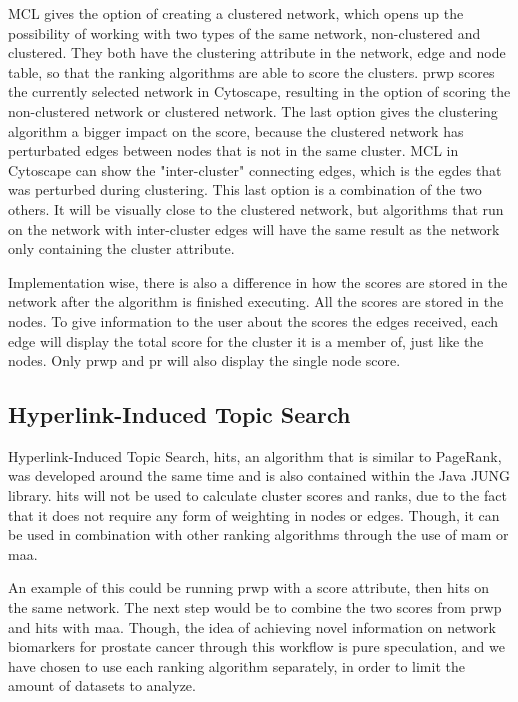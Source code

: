 MCL gives the option of creating a clustered network, which opens up the
possibility of working with two types of the same network, non-clustered and
clustered. They both have the clustering attribute in the network, edge and node
table, so that the ranking algorithms are able to score the clusters. \gls{prwp}
scores the currently selected network in Cytoscape, resulting in the option of
scoring the non-clustered network or clustered network. The last option gives
the clustering algorithm a bigger impact on the score, because the clustered
network has perturbated edges between nodes that is not in the same cluster. MCL
in Cytoscape can show the "inter-cluster" connecting edges, which is the egdes
that was perturbed during clustering. This last option is a combination of the
two others. It will be visually close to the clustered network, but algorithms
that run on the network with inter-cluster edges will have the same result as
the network only containing the cluster attribute.

Implementation wise, there is also a difference in how the scores are stored in
the network after the algorithm is finished executing. All the scores are stored
in the nodes. To give information to the user about the scores the edges
received, each edge will display the total score for the cluster it is a member
of, just like the nodes. Only \gls{prwp} and \gls{pr} will also display the
single node score.

\subsection{Hyperlink-Induced Topic Search}
Hyperlink-Induced Topic Search, \gls{hits}, an algorithm that is similar to
PageRank, was developed around the same time \cite{hits}\cite{hits-origin} and
is also contained within the Java JUNG library. \gls{hits} will not be used to
calculate cluster scores and ranks, due to the fact that it does not require any
form of weighting in nodes or edges. Though, it can be used in combination with
other ranking algorithms through the use of \gls{mam} or \gls{maa}. 

An example of this could be running \gls{prwp} with a score attribute, then
\gls{hits} on the same network. The next step would be to combine the two scores
from \gls{prwp} and \gls{hits} with \gls{maa}. Though, the idea of achieving
novel information on network biomarkers for prostate cancer through this
workflow is pure speculation, and we have chosen to use each ranking algorithm
separately, in order to limit the amount of datasets to analyze.

